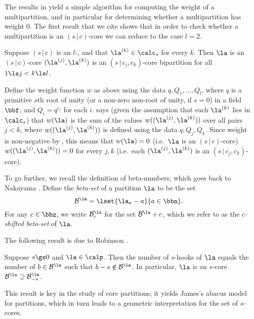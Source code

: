 \documentclass[a4paper, 11pt, twoside]{article}
\begin{document}
The results in \cite[Section~3]{mfwt} yield a simple algorithm for computing the weight of a multipartition, and in particular for determining whether a multipartition has weight $0$. The first result that we cite shows that in order to check whether a multipartition is an $(s\,|\,c)$-core we can reduce to the case $l=2$.

\begin{propn}\label{lev2}
Suppose $(s\,|\,c)$ is an $l$-\mcd, and that $\cpt\la k\in\cores s$ for every $k$. Then $\la$ is an $(s\,|\,c)$-core \iff $(\cpt\la j,\cpt\la k)$ is an $(s\,|\,c_j,c_k)$-core bipartition for all $1\ls j<k\ls l$.
\end{propn}

\begin{pf}
Define the weight function $w$ as above using the data $q,Q_1,\dots,Q_l$, where $q$ is a primitive $s$th root of unity (or a non-zero non-root of unity, if $s=0$) in a field $\bbf$, and $Q_i=q^{c_i}$ for each $i$. \cite[Proposition 3.5]{mfwt} says (given the assumption that each $\cpt\la k$ lies in $\cores s$) that $w(\la)$ is the sum of the values $w((\la^{(j)},\la^{(k)}))$ over all pairs $j<k$, where $w((\la^{(j)},\la^{(k)}))$ is defined using the data $q,Q_j,Q_k$. Since weight is non-negative by \cite[Corollary 3.9]{mfwt}, this means that $w(\la)=0$ (i.e.\ $\la$ is an $(s\,|\,c)$-core) \iff $w((\la^{(j)},\la^{(k)}))=0$ for every $j,k$ (i.e.\ each $(\la^{(j)},\la^{(k)})$ is an $(s\,|\,c_j,c_k)$-core).
\end{pf}

To go further, we recall the definition of beta-numbers, which goes back to Nakayama \cite{nak}. Define the \emph{beta-set} of a partition $\la$ to be the set
\[
\be\la=\lset{\la_a-a}{a\in\bbn}.
\]
For any $c\in\bbz$, we write $\ber\la c$ for the set $\be\la+c$, which we refer to as the \emph{$c$-shifted beta-set} of $\la$.

The following result is due to Robinson \cite[(2.8)]{robin4}.

\begin{propn}\label{corebeta}
Suppose $s\gs0$ and $\la\in\calp$. Then the number of $s$-hooks of $\la$ equals the number of $b\in\be\la$ such that $b-s\notin\be\la$. In particular, $\la$ is an $s$-core \iff $\be\la\supseteq\berm\la s$.
\end{propn}

This result is key in the study of core partitions; it yields James's abacus model \cite[Section~2.7]{jk} for partitions, which in turn leads to a geometric interpretation for the set of $s$-cores.
\end{document}
